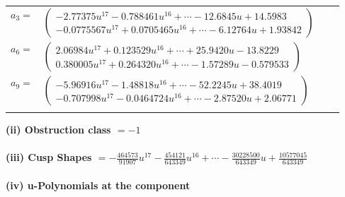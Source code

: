 \documentclass[1p]{elsarticle_modified}
\theoremstyle{definition}
\begin{document}
\begin{tabular}{m{7pt} m{180pt} m{7pt} m{180pt} }
\flushright $a_{3}=$&$\begin{pmatrix}-2.77375 u^{17}-0.788461 u^{16}+\cdots-12.6845 u+14.5983\\-0.0775567 u^{17}+0.0705465 u^{16}+\cdots-6.12764 u+1.93842\end{pmatrix}$ \\
\flushright $a_{6}=$&$\begin{pmatrix}2.06984 u^{17}+0.123529 u^{16}+\cdots+25.9420 u-13.8229\\0.380005 u^{17}+0.264320 u^{16}+\cdots-1.57289 u-0.579533\end{pmatrix}$ \\
\flushright $a_{9}=$&$\begin{pmatrix}-5.96916 u^{17}-1.48818 u^{16}+\cdots-52.2245 u+38.4019\\-0.707998 u^{17}-0.0464724 u^{16}+\cdots-2.87520 u+2.06771\end{pmatrix}$\\&\end{tabular}
\flushleft \textbf{(ii) Obstruction class $= -1$}\\~\\
\flushleft \textbf{(iii) Cusp Shapes $= -\frac{464573}{91907} u^{17}-\frac{454121}{643349} u^{16}+\cdots-\frac{30228500}{643349} u+\frac{10577045}{643349}$}\\~\\
\newpage\renewcommand{\arraystretch}{1}
\flushleft \textbf{(iv) u-Polynomials at the component}\newline \\
\end{document}
